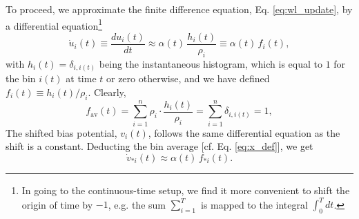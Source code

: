 \documentclass[reprint, superscriptaddress, floatfix]{revtex4-1}
\newcommand{\bav}[1]{#1_\mathrm{av}}
\begin{document}
To proceed, we
approximate the finite difference equation, Eq. \eqref{eq:wl_update},
by a differential equation\footnote{In
going to the continuous-time setup,
we find it more convenient to shift the origin of time by $-1$,
e.g. the sum $\sum_{i=1}^T$ is mapped to the integral $\int_0^T dt$.}
%
\begin{equation}
  \dot u_i(t)
  \equiv
  \frac{ d u_i(t) } { dt }
  \approx
  \alpha(t) \, \frac{ h_i(t) } { \rho_i }
  \equiv
  \alpha(t) \, f_i(t)
  ,
  \label{eq:ut_diffeq}
\end{equation}
%
with
%
$h_i(t) = \delta_{i, i(t)}$
%
being the instantaneous histogram,
which is equal to $1$
for the bin $i(t)$ at time $t$
or zero otherwise,
and we have defined
$f_i(t) \equiv h_i(t) /\rho_i$.
%
Clearly,
%
\begin{equation}
  \bav{f}(t)
  = \sum_{i=1}^n \rho_i \cdot \frac{ h_i(t) } { \rho_i }
  = \sum_{i=1}^n \delta_{i, i(t)}
  = 1
  ,
  \label{eq:fav1}
\end{equation}
%
The shifted bias potential, $v_i(t)$,
follows the same differential equation
as the shift is a constant.
%
Deducting the bin average [cf. Eq. \eqref{eq:x_def}],
we get
%
\begin{equation}
  \dot v_{*i}(t)
  \approx
  \alpha(t) \, f_{*i}(t)
  .
  \label{eq:vt_diffeq}
\end{equation}
\end{document}
